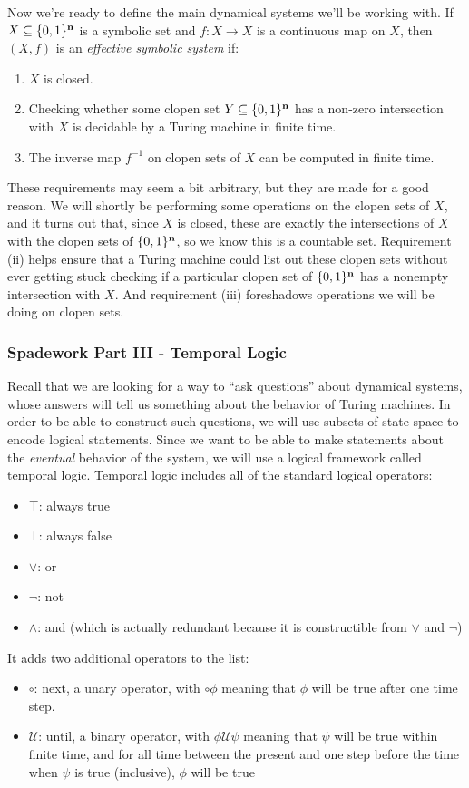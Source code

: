 \documentclass{fkpaper}
\newcommand{\lnext}{\circ}
\newcommand{\ltil}{\mathcal{U}}
\begin{document}
\begin{multicols}{2}
Now we're ready to define the main dynamical systems we'll be working with. If $X \subseteq \{0,1\}^{\mathbf{n}}$ is a symbolic set and $f: X \to X$ is a continuous map on $X$, then $(X, f)$ is an {\it effective symbolic system} if:
\begin{enumerate}[label=(\roman*)]
  \item $X$ is closed.
  \item Checking whether some clopen set $Y \subseteq \{0,1\}^{\mathbf{n}}$ has a non-zero intersection with $X$ is decidable by a Turing machine in finite time.
  \item The inverse map $f^{-1}$ on clopen sets of $X$ can be computed in finite time.
\end{enumerate}

These requirements may seem a bit arbitrary, but they are made for a good reason. We will shortly be performing some operations on the clopen sets of $X$, and it turns out that, since $X$ is closed, these are exactly the intersections of $X$ with the clopen sets of $\{0,1\}^{\mathbf{n}}$, so we know this is a countable set. Requirement (ii) helps ensure that a Turing machine could list out these clopen sets without ever getting stuck checking if a particular clopen set of $\{0,1\}^{\mathbf{n}}$ has a nonempty intersection with $X$. And requirement (iii) foreshadows operations we will be doing on clopen sets.

\subsubsection*{Spadework Part III - Temporal Logic}

Recall that we are looking for a way to ``ask questions'' about dynamical systems, whose answers will tell us something about the behavior of Turing machines. In order to be able to construct such questions, we will use subsets of state space to encode logical statements. Since we want to be able to make statements about the {\it eventual} behavior of the system, we will use a logical framework called temporal logic. Temporal logic includes all of the standard logical operators:
\begin{itemize}
  \item $\top$: always true
  \item $\bot$: always false
  \item $\lor$: or
  \item $\lnot$: not
  \item $\land$: and (which is actually redundant because it is constructible from $\lor$ and $\lnot$)
\end{itemize}
It adds two additional operators to the list:
\begin{itemize}
  \item $\lnext$: next, a unary operator, with $\lnext \phi$ meaning that $\phi$ will be true after one time step.
  \item $\ltil$: until, a binary operator, with $\phi \ltil \psi$ meaning that $\psi$ will be true within finite time, and for all time between the present and one step before the time when $\psi$ is true (inclusive), $\phi$ will be true
\end{itemize}


\end{multicols}
\end{document}
